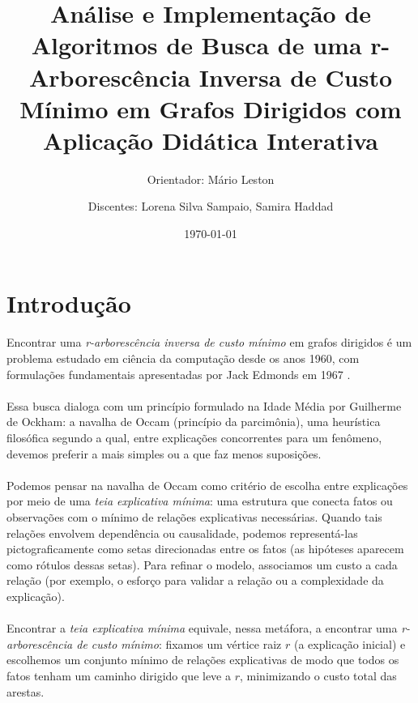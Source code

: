 \documentclass[12pt,a4paper]{article}
\title{Análise e Implementação de Algoritmos de Busca de uma r-Arborescência Inversa de Custo Mínimo em Grafos Dirigidos com Aplicação Didática Interativa}
\author{Orientador: Mário Leston 
\and Discentes: Lorena Silva Sampaio, Samira Haddad}
\date{\today}
\begin{document}
\maketitle

\section{Introdução}

\paragraph{}
Encontrar uma \textit{r-arborescência inversa de custo mínimo} em grafos dirigidos é um problema estudado em ciência da computação desde os anos 1960, com formulações fundamentais apresentadas por Jack Edmonds em 1967 \cite{edmonds1967optimum}.

\paragraph{}
Essa busca dialoga com um princípio formulado na Idade Média por Guilherme de Ockham: a navalha de Occam (princípio da parcimônia), uma heurística filosófica segundo a qual, entre explicações concorrentes para um fenômeno, devemos preferir a mais simples ou a que faz menos suposições.

\paragraph{}
Podemos pensar na navalha de Occam como critério de escolha entre explicações por meio de uma \textit{teia explicativa mínima}: uma estrutura que conecta fatos ou observações com o mínimo de relações explicativas necessárias.
Quando tais relações envolvem dependência ou causalidade, podemos representá-las pictograficamente como setas direcionadas entre os fatos (as hipóteses aparecem como rótulos dessas setas).
Para refinar o modelo, associamos um custo a cada relação (por exemplo, o esforço para validar a relação ou a complexidade da explicação).

\paragraph{}
Encontrar a \textit{teia explicativa mínima} equivale, nessa metáfora, a encontrar uma \textit{r-arborescência de custo mínimo}: fixamos um vértice raiz \(r\) (a explicação inicial) e escolhemos um conjunto mínimo de relações explicativas de modo que todos os fatos tenham um caminho dirigido que leve a \(r\), minimizando o custo total das arestas.
\end{document}
